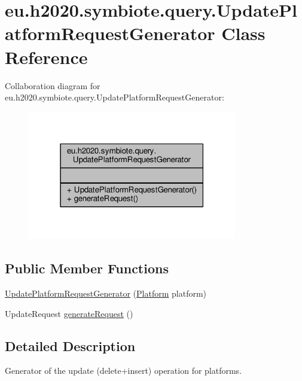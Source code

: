 \hypertarget{classeu_1_1h2020_1_1symbiote_1_1query_1_1UpdatePlatformRequestGenerator}{}\section{eu.\+h2020.\+symbiote.\+query.\+Update\+Platform\+Request\+Generator Class Reference}
\label{classeu_1_1h2020_1_1symbiote_1_1query_1_1UpdatePlatformRequestGenerator}


Collaboration diagram for eu.\+h2020.\+symbiote.\+query.\+Update\+Platform\+Request\+Generator\+:
\nopagebreak
\begin{figure}[H]
\begin{center}
\leavevmode
\includegraphics[width=259pt]{classeu_1_1h2020_1_1symbiote_1_1query_1_1UpdatePlatformRequestGenerator__coll__graph}
\end{center}
\end{figure}
\subsection*{Public Member Functions}
\begin{DoxyCompactItemize}
\item 
\hyperlink{classeu_1_1h2020_1_1symbiote_1_1query_1_1UpdatePlatformRequestGenerator_a4fb25d7c6e7bff5e8db000400340f9de}{Update\+Platform\+Request\+Generator} (\hyperlink{classeu_1_1h2020_1_1symbiote_1_1model_1_1Platform}{Platform} platform)
\item 
Update\+Request \hyperlink{classeu_1_1h2020_1_1symbiote_1_1query_1_1UpdatePlatformRequestGenerator_a2d2069803f66fd91ab153a856ce0b512}{generate\+Request} ()
\end{DoxyCompactItemize}


\subsection{Detailed Description}
Generator of the update (delete+insert) operation for platforms.

